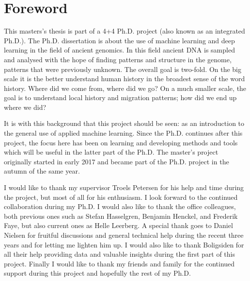 \chapter*{Foreword}

This masters's thesis is part of a 4+4 Ph.D. project (also known as an integrated Ph.D.). The Ph.D. dissertation is about the use of machine learning and deep learning in the field of ancient genomics. In this field ancient DNA is sampled and analysed with the hope of finding patterns and structure in the genome, patterns that were previously unknown. The overall goal is two-fold. On the big scale it is the better understand human history in the broadest sense of the word history. Where did we come from, where did we go? On a much smaller scale, the goal is to understand local history and migration patterns; how did we end up where we did? 

It is with this background that this project should be seen: as an introduction to the general use of applied machine learning. Since the Ph.D. continues after this project, the focus here has been on learning and developing methods and tools which will be useful in the latter part of the Ph.D. The master's project originally started in early \num{2017} and became part of the Ph.D. project in the autumn of the same year. 

I would like to thank my supervisor Troels Petersen for his help and time during the project, but most of all for his enthusiasm. I look forward to the continued collaboration during my Ph.D. I would also like to thank the office colleagues, both previous ones such as Stefan Hasselgren, Benjamin Henckel, and Frederik Faye, but also current ones as Helle Leerberg. A special thank goes to Daniel Nielsen for fruitful discussions and general technical help during the recent three years and for letting me lighten him up. I would also like to thank Boligsiden for all their help providing data and valuable insights during the first part of this project. Finally I would like to thank my friends and family for the continued support during this project and hopefully the rest of my Ph.D. 